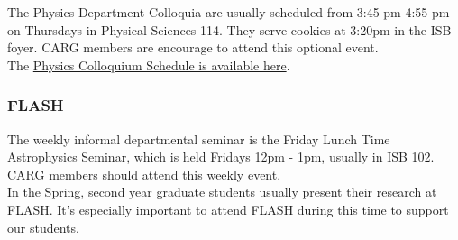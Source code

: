 The Physics Department Colloquia are usually
scheduled from 3:45 pm-4:55 pm on Thursdays
in Physical Sciences 114. They serve
cookies at 3:20pm in the ISB foyer. 
CARG members are encourage to attend
this optional event.\\

\noindent
The
\href{https://www.physics.ucsc.edu/news-events/colloquia/index.html}{Physics Colloquium Schedule is available here}.

\subsubsection{FLASH}
\label{sec:flash}

The weekly informal departmental
seminar is the
Friday Lunch Time Astrophysics Seminar,
which is held
Fridays 12pm - 1pm, usually in ISB 102.
CARG members should attend this
weekly event.\\

\noindent
In the Spring, second year 
graduate students
usually present their research at
FLASH. It's especially important
to attend FLASH during this
time to support our students.
